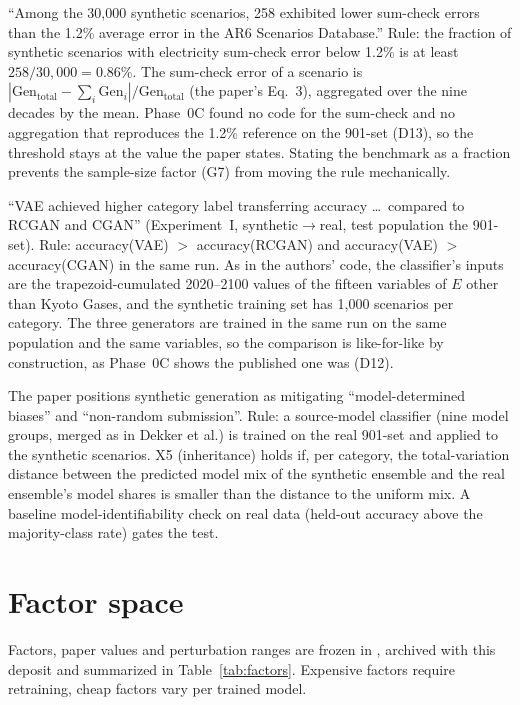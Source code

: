 \documentclass[11pt,a4paper]{article}
\newcommand{\prop}[1]{#1}
\newcommand{\prop}[1]{\textcolor{blue}{#1}}
\newcommand{\claim}[1]{\textbf{#1}}
\begin{document}
\begin{description}[style=nextline]
\item[\claim{X3} (internal consistency).] ``Among the 30{,}000 synthetic
  scenarios, 258 exhibited lower sum-check errors than the 1.2\% average
  error in the AR6 Scenarios Database.'' Rule: \prop{the fraction} of
  synthetic scenarios with electricity sum-check error below 1.2\% is at
  least \prop{$258/30{,}000 = 0.86\%$}. The sum-check error of a scenario
  is $|\mathrm{Gen}_{\mathrm{total}}-\sum_i
  \mathrm{Gen}_i|/\mathrm{Gen}_{\mathrm{total}}$ (the paper's Eq.~3),
  aggregated over the nine decades by \prop{the mean. Phase~0C found no
  code for the sum-check and no aggregation that reproduces the 1.2\%
  reference on the 901-set (D13), so the threshold stays at the value the
  paper states.} \prop{Stating the benchmark as a
  fraction prevents the sample-size factor (G7) from moving the rule
  mechanically.}
\item[\claim{X4} (VAE superiority).] ``VAE achieved higher category label
  transferring accuracy \dots\ compared to RCGAN and CGAN'' (Experiment~I,
  synthetic$\to$real, test population the 901-set). Rule: accuracy(VAE)
  $>$ accuracy(RCGAN) and accuracy(VAE) $>$ accuracy(CGAN) in the same
  run. \prop{As in the authors' code, the classifier's inputs are the
  trapezoid-cumulated 2020--2100 values of the fifteen variables of $E$
  other than Kyoto Gases, and the synthetic training set has 1{,}000
  scenarios per category. The three generators are trained in the same run
  on the same population and the same variables, so the comparison is
  like-for-like by construction, as Phase~0C shows the published one was
  (D12).}
\item[\claim{X5} (bias inheritance, secondary).] The paper positions
  synthetic generation as mitigating ``model-determined biases'' and
  ``non-random submission''. Rule: a source-model classifier (nine model
  groups, merged as in Dekker et al.) is trained on the real 901-set and
  applied to the synthetic scenarios. X5 (inheritance) holds if, per
  category, the total-variation distance between the predicted model mix
  of the synthetic ensemble and the real ensemble's model shares is smaller
  than the distance to the uniform mix. A baseline model-identifiability
  check on real data (held-out accuracy above the majority-class rate)
  gates the test.
\end{description}

\section{Factor space}\label{sec:factors}
Factors, paper values and perturbation ranges are frozen in
, archived with this deposit and summarized
in Table~\ref{tab:factors}. Expensive factors require retraining, cheap
factors vary per trained model.
\end{document}
